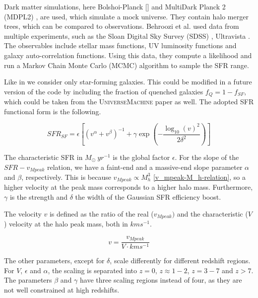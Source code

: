 Dark matter simulations, here Bolshoi-Planck [\cite{klypin_dark_2011}] and MultiDark Planck 2 (MDPL2) \cite{klypin_multidark_2016}, are used, which simulate a mock universe. They contain halo merger trees, which can be compared to observations. Behroozi et al. used data from multiple experiments, such as the Sloan Digital Sky Survey (SDSS) \cite{abazajian_seventh_2009}, Ultravista \cite{mccracken_ultravista_2012}. The observables include stellar mass functions, UV luminosity functions and galaxy auto-correlation functions.
Using this data, they compute a likelihood and run a Markov Chain Monte Carlo (MCMC) algorithm to sample the SFR range.

Like in \cite{dallarmi_dipole_2022} we consider only star-forming galaxies. This could be modified in a future version of the code by including the fraction of quenched galaxies $f_Q = 1 -f_{SF}$, which could be taken from the \textsc{UniverseMachine} paper as well. The adopted SFR functional form is the following.

\begin{equation}
    SFR_{SF} = \epsilon \left[ \left( v^\alpha + v^\beta \right)^{-1} + \gamma \exp \left(-\frac{\log_{10}(v)^2}{2\delta^2}\right) \right]
\end{equation}

The characteristic SFR  in $M_\odot\ yr^{-1}$ is the global factor $\epsilon$. For the slope of the $SFR-v_{Mpeak}$ relation, we have a faint-end and a massive-end slope parameter $\alpha$ and $\beta$, respectively. This is because $v_{Mpeak} \propto M_h^3$ \ref{v_mpeak-M_h-relation}, so a higher velocity at the peak mass corresponds to a higher halo mass.
Furthermore, $\gamma$ is the strength and $\delta$ the width of the Gaussian SFR efficiency boost. 

The velocity $v$ is defined as the ratio of the real ($v_{Mpeak})$ and the characteristic ($V$) velocity at the halo peak mass, both in $km s^{-1}$.

\begin{equation}
    v = \frac{v_{Mpeak}}{V \cdot km s^{-1}}
\end{equation}

The other parameters, except for $\delta$, scale differently for different redshift regions. For $V$, $\epsilon$ and $\alpha$, the scaling is separated into $z=0$, $z\approx 1-2$, $z=3-7$ and $z>7$. The parameters $\beta$ and $\gamma$ have three scaling regions instead of four, as they are not well constrained at high redshifts. 

